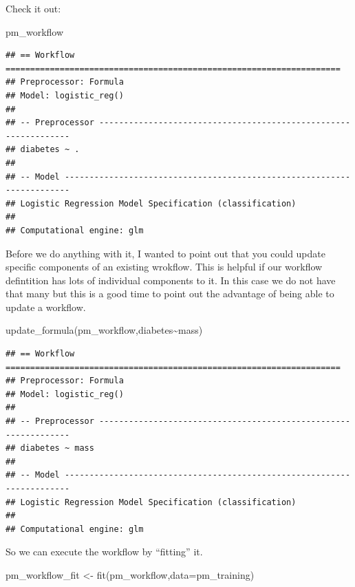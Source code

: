 \documentclass[
]{article}
\newenvironment{Shaded}{\begin{snugshade}}{\end{snugshade}}
\newcommand{\AttributeTok}[1]{\textcolor[rgb]{0.77,0.63,0.00}{#1}}
\newcommand{\FunctionTok}[1]{\textcolor[rgb]{0.00,0.00,0.00}{#1}}
\newcommand{\NormalTok}[1]{#1}
\newcommand{\OtherTok}[1]{\textcolor[rgb]{0.56,0.35,0.01}{#1}}
\newcommand{\SpecialCharTok}[1]{\textcolor[rgb]{0.00,0.00,0.00}{#1}}
\begin{document}
Check it out:

\begin{Shaded}
\begin{Highlighting}[]
\NormalTok{pm\_workflow}
\end{Highlighting}
\end{Shaded}

\begin{verbatim}
## == Workflow ====================================================================
## Preprocessor: Formula
## Model: logistic_reg()
## 
## -- Preprocessor ----------------------------------------------------------------
## diabetes ~ .
## 
## -- Model -----------------------------------------------------------------------
## Logistic Regression Model Specification (classification)
## 
## Computational engine: glm
\end{verbatim}

Before we do anything with it, I wanted to point out that you could
update specific components of an existing wrokflow. This is helpful if
our workflow defintition has lots of individual components to it. In
this case we do not have that many but this is a good time to point out
the advantage of being able to update a workflow.

\begin{Shaded}
\begin{Highlighting}[]
\FunctionTok{update\_formula}\NormalTok{(pm\_workflow,diabetes}\SpecialCharTok{\textasciitilde{}}\NormalTok{mass)}
\end{Highlighting}
\end{Shaded}

\begin{verbatim}
## == Workflow ====================================================================
## Preprocessor: Formula
## Model: logistic_reg()
## 
## -- Preprocessor ----------------------------------------------------------------
## diabetes ~ mass
## 
## -- Model -----------------------------------------------------------------------
## Logistic Regression Model Specification (classification)
## 
## Computational engine: glm
\end{verbatim}

So we can execute the workflow by ``fitting'' it.

\begin{Shaded}
\begin{Highlighting}[]
\NormalTok{pm\_workflow\_fit }\OtherTok{\textless{}{-}} \FunctionTok{fit}\NormalTok{(pm\_workflow,}\AttributeTok{data=}\NormalTok{pm\_training)}
\end{Highlighting}
\end{Shaded}
\end{document}

